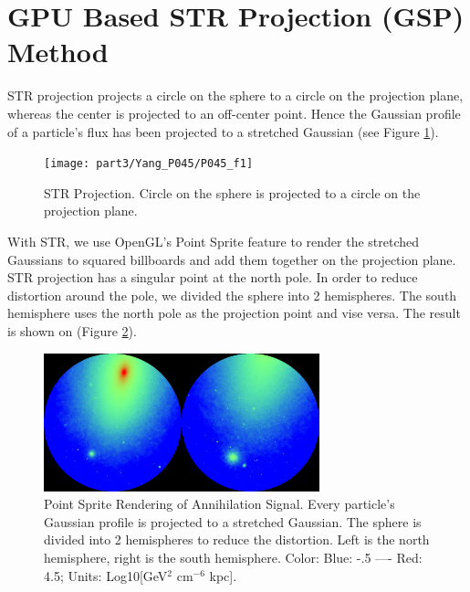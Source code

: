 \section{GPU Based STR Projection (GSP) Method}
STR projection projects a circle on the sphere to a circle on the projection plane, whereas the center is projected to an off-center point. Hence the Gaussian profile of a particle's flux has been projected to a stretched Gaussian (see Figure \ref{figstr}). 

\begin{figure}[htb]
\begin{center}
 \texttt{[image: part3/Yang\_P045/P045\_f1]}
\caption{STR Projection. Circle on the sphere is projected to a circle on the projection plane.\label{figstr}}
\end{center}
\end{figure}

With STR, we use OpenGL's Point Sprite feature to render the stretched Gaussians to squared billboards and add them together on the projection plane. STR projection has a singular point at the north pole. In order to reduce distortion around the pole, we divided the  sphere into 2 hemispheres. The south hemisphere uses the north pole as the projection point and vise versa. The result is shown on (Figure \ref{figsky}).

\begin{figure}[htb]
\begin{center}
 \includegraphics[width=80mm]{part3/Yang_P045/P045_f2}
\caption{ Point Sprite Rendering of Annihilation Signal. Every particle's Gaussian profile is projected to a stretched Gaussian. The sphere is divided into 2 hemispheres to reduce the distortion. Left is the north hemisphere, right is the south hemisphere. Color: Blue: -.5 ---- Red: 4.5;  Units: Log10[GeV$^2$ cm$^{-6}$ kpc].\label{figsky}}
\end{center}
\end{figure}

